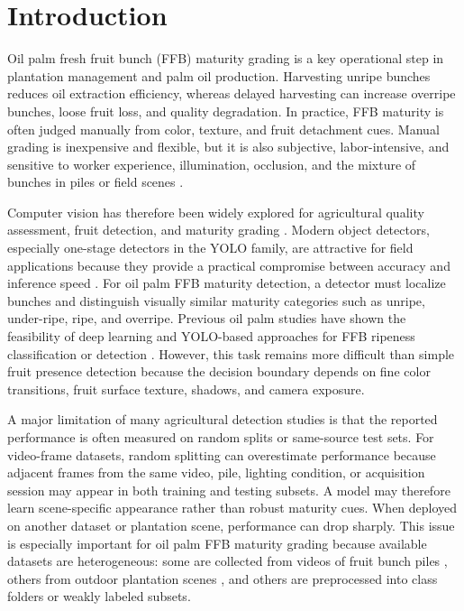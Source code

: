 ﻿\documentclass[12pt]{article}
\begin{document}
\section{Introduction}

Oil palm fresh fruit bunch (FFB) maturity grading is a key operational step in plantation management and palm oil production. Harvesting unripe bunches reduces oil extraction efficiency, whereas delayed harvesting can increase overripe bunches, loose fruit loss, and quality degradation. In practice, FFB maturity is often judged manually from color, texture, and fruit detachment cues. Manual grading is inexpensive and flexible, but it is also subjective, labor-intensive, and sensitive to worker experience, illumination, occlusion, and the mixture of bunches in piles or field scenes \citep{suharjito2023dataset,omar2024outdoor}.

Computer vision has therefore been widely explored for agricultural quality assessment, fruit detection, and maturity grading \citep{bargoti2017fruit,kamilaris2018survey}. Modern object detectors, especially one-stage detectors in the YOLO family, are attractive for field applications because they provide a practical compromise between accuracy and inference speed \citep{redmon2016yolo,jocher2023yolov8}. For oil palm FFB maturity detection, a detector must localize bunches and distinguish visually similar maturity categories such as unripe, under-ripe, ripe, and overripe. Previous oil palm studies have shown the feasibility of deep learning and YOLO-based approaches for FFB ripeness classification or detection \citep{suharjito2021mobile,lai2022yolov4,mansour2022object}. However, this task remains more difficult than simple fruit presence detection because the decision boundary depends on fine color transitions, fruit surface texture, shadows, and camera exposure.

A major limitation of many agricultural detection studies is that the reported performance is often measured on random splits or same-source test sets. For video-frame datasets, random splitting can overestimate performance because adjacent frames from the same video, pile, lighting condition, or acquisition session may appear in both training and testing subsets. A model may therefore learn scene-specific appearance rather than robust maturity cues. When deployed on another dataset or plantation scene, performance can drop sharply. This issue is especially important for oil palm FFB maturity grading because available datasets are heterogeneous: some are collected from videos of fruit bunch piles \citep{suharjito2023dataset}, others from outdoor plantation scenes \citep{omar2024outdoor}, and others are preprocessed into class folders or weakly labeled subsets.
\end{document}
